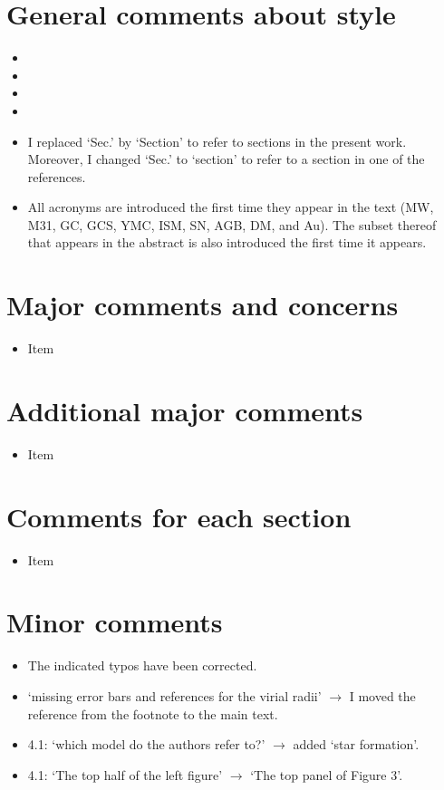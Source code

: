 \documentclass{article}
\begin{document}
\section*{General comments about style}
\begin{itemize}
\item
\item
\item
\item
\item I replaced `Sec.' by `Section' to refer to sections in the present work.
Moreover, I changed `Sec.' to `section' to refer to a section in one of the references.
\item All acronyms are introduced the first time they appear in the text
(MW, M31, GC, GCS, YMC, ISM, SN, AGB, DM, and Au). The subset thereof that appears 
in the abstract is also introduced the first time it appears.
\end{itemize}


\section*{Major comments and concerns}
\begin{itemize}
\item Item
\end{itemize}


\section*{Additional major comments}
\begin{itemize}
\item Item
\end{itemize}


\section*{Comments for each section}
\begin{itemize}
\item Item
\end{itemize}



\section*{Minor comments}
\begin{itemize}
\item The indicated typos have been corrected.
\item `missing error bars and references for the virial radii' $\rightarrow$
    I moved the reference from the footnote to the main text.
\item 4.1: `which model do the authors refer to?' $\rightarrow$ 
    added `star formation'.
\item 4.1: `The top half of the left figure' $\rightarrow$ 
    `The top panel of Figure 3'.
\end{itemize}
\end{document}

